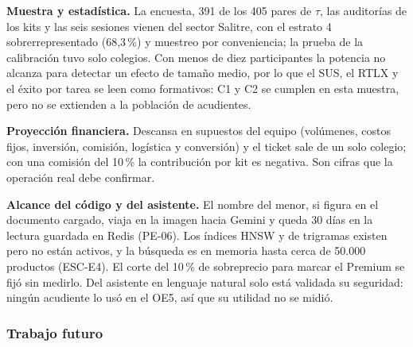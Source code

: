 \textbf{Muestra y estadística.} La encuesta, 391 de los 405 pares de $\tau$, las auditorías de los kits y las seis sesiones vienen del sector Salitre, con el estrato 4 sobrerrepresentado (68,3\,\%) y muestreo por conveniencia; la prueba de la calibración tuvo solo \calColegiosPrueba{} colegios. Con menos de diez participantes la potencia no alcanza para detectar un efecto de tamaño medio, por lo que el SUS, el RTLX y el éxito por tarea se leen como formativos: C1 y C2 se cumplen en esta muestra, pero no se extienden a la población de acudientes.

\textbf{Proyección financiera.} Descansa en supuestos del equipo (volúmenes, costos fijos, inversión, comisión, logística y conversión) y el ticket sale de un solo colegio; con una comisión del 10\,\% la contribución por kit es negativa. Son cifras que la operación real debe confirmar.

\textbf{Alcance del código y del asistente.} El nombre del menor, si figura en el documento cargado, viaja en la imagen hacia Gemini y queda 30 días en la lectura guardada en Redis (PE-06). Los índices HNSW y de trigramas existen pero no están activos, y la búsqueda es en memoria hasta cerca de 50.000 productos (ESC-E4). El corte del 10\,\% de sobreprecio para marcar el Premium se fijó sin medirlo. Del asistente en lenguaje natural solo está validada su seguridad: ningún acudiente lo usó en el OE5, así que su utilidad no se midió.

\subsubsection{Trabajo futuro}
\label{sec:trabajo-futuro}

